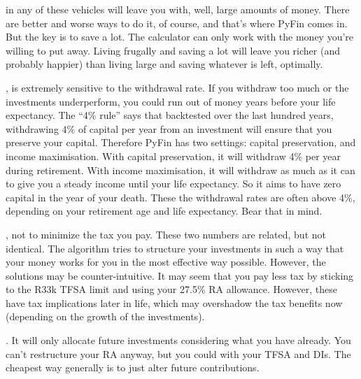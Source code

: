 \documentclass[a4paper, justified]{tufte-handout}
\begin{document}
 in any of these vehicles will leave you with, well, large amounts of money. There are better and worse ways to do it, of course, and that's where PyFin comes in. But the key is to save a lot. The calculator can only work with the money you're willing to put away. Living frugally and saving a lot will leave you richer (and probably happier) than living large and saving whatever is left, optimally.

, is extremely sensitive to the withdrawal rate. If you withdraw too much or the investments underperform, you could run out of money years before your life expectancy. The ``4\% rule'' says that backtested over the last hundred years, withdrawing 4\% of capital per year from an investment will ensure that you preserve your capital. Therefore PyFin has two settings: capital preservation, and income maximisation. With capital preservation, it will withdraw 4\% per year during retirement. With income maximisation, it will withdraw as much as it can to give you a steady income until your life expectancy. So it aims to have zero capital in the year of your death. These the withdrawal rates are often above 4\%, depending on your retirement age and life expectancy. Bear that in mind.

, not to minimize the tax you pay. These two numbers are related, but not identical. The algorithm tries to structure your investments in such a way that your money works for you in the most effective way possible. However, the solutions may be counter-intuitive. It may seem that you pay less tax by sticking to the R33k TFSA limit and using your 27.5\% RA allowance. However, these have tax implications later in life, which may overshadow the tax benefits now (depending on the growth of the investments). 

. It will only allocate future investments considering what you have already. You can't restructure your RA anyway, but you could with your TFSA and DIs. The cheapest way generally is to just alter future contributions.
\end{document}
